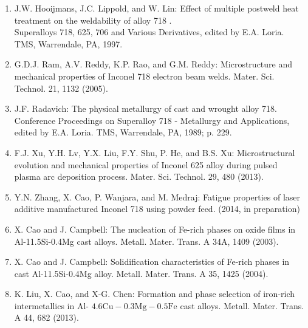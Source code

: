 \documentclass[10pt]{article}
\begin{document}
\begin{enumerate}
  \item J.W. Hooijmans, J.C. Lippold, and W. Lin: Effect of multiple postweld heat treatment on the weldability of alloy 718 .\\
Superalloys 718, 625, 706 and Various Derivatives, edited by E.A. Loria. TMS, Warrendale, PA, 1997.

  \item G.D.J. Ram, A.V. Reddy, K.P. Rao, and G.M. Reddy: Microstructure and mechanical properties of Inconel 718 electron beam welds. Mater. Sci. Technol. 21, 1132 (2005).

  \item J.F. Radavich: The physical metallurgy of cast and wrought alloy 718. Conference Proceedings on Superalloy 718 - Metallurgy and Applications, edited by E.A. Loria. TMS, Warrendale, PA, 1989; p. 229.

  \item F.J. Xu, Y.H. Lv, Y.X. Liu, F.Y. Shu, P. He, and B.S. Xu: Microstructural evolution and mechanical properties of Inconel 625 alloy during pulsed plasma arc deposition process. Mater. Sci. Technol. 29, 480 (2013).

  \item Y.N. Zhang, X. Cao, P. Wanjara, and M. Medraj: Fatigue properties of laser additive manufactured Inconel 718 using powder feed. (2014, in preparation)

  \item X. Cao and J. Campbell: The nucleation of Fe-rich phases on oxide films in Al-11.5Si-0.4Mg cast alloys. Metall. Mater. Trans. A 34A, 1409 (2003).

  \item X. Cao and J. Campbell: Solidification characteristics of Fe-rich phases in cast Al-11.5Si-0.4Mg alloy. Metall. Mater. Trans. A 35, 1425 (2004).

  \item K. Liu, X. Cao, and X-G. Chen: Formation and phase selection of iron-rich intermetallics in Al- $4.6 \mathrm{Cu}-0.3 \mathrm{Mg}-0.5 \mathrm{Fe}$ cast alloys. Metall. Mater. Trans. A 44, 682 (2013).

\end{enumerate}
\end{document}
